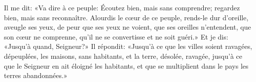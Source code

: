 Il me dit: «Va dire à ce peuple:
	Écoutez bien, mais sans comprendre; regardez bien, mais sans reconnaître.
Alourdis le cœur de ce peuple, rends-le dur d’oreille, aveugle ses yeux,
	de peur que ses yeux ne voient, que ses oreilles n’entendent,
	que son cœur ne comprenne, qu’il ne se convertisse et ne soit guéri.»
Et je dis: «Jusqu’à quand, Seigneur?»
Il répondit: «Jusqu’à ce que les villes soient ravagées, dépeuplées,
	les maisons, sans habitants, et la terre, désolée, ravagée,
	jusqu’à ce que le Seigneur en ait éloigné les habitants,
	et que se multiplient dans le pays les terres abandonnées.»
